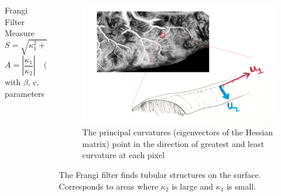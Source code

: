 \documentclass[9pt]{beamer}
\newcommand{\Blue}[1]{{\color{Blue}{#1}}}
\begin{document}
\begin{frame}
\begin{columns}[c]
\begin{column}{0.4\textwidth}
\begin{block}{\footnotesize Frangi Filter Measure}
	\begin{equation}
	S = \sqrt{\kappa_1^2 + \kappa_2^2} \quad\text{(structureness)}
	\end{equation}	
	\begin{equation}
	A = \left|\frac{{\kappa_1}}{\kappa_2}\right| \quad\text{(anisotropy)}
	\end{equation}
	\qquad \qquad with $\beta$, c, parameters
	\end{block}
\end{column}
\begin{column}{0.55\textwidth}
\begin{figure}[h]
\includegraphics[width=\textwidth]{svginset}
\caption{\footnotesize{The principal curvatures (eigenvectors of the Hessian matrix) point in the direction of greatest and least curvature at each pixel}}
\end{figure}

The Frangi filter \Blue{[2]} finds tubular structures on the surface. Corresponds to areas where $\kappa_2$ is large and $\kappa_1$ is small.

\end{column}
\end{columns}
\end{frame}
\end{document}
